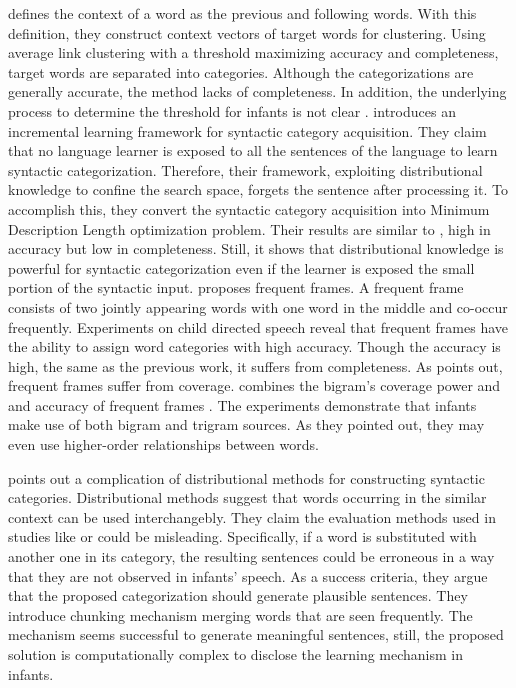 \cite{Redington98distributionalinformation} defines the context of
a word as the previous and following words. With this definition, they construct
context vectors of target words for clustering. Using average link clustering
with a threshold maximizing accuracy and completeness, target  words are
separated into categories. Although the categorizations are generally accurate,
the method lacks of completeness. In addition, the underlying process to determine
the threshold for infants is not clear \cite{ambridge2011child}. \cite{cartwright1997syntactic} introduces an incremental learning framework for syntactic category acquisition. They claim that no language 
learner is exposed to all the sentences of the language to learn
syntactic categorization. Therefore, their framework, exploiting
distributional knowledge to confine the search space, forgets the sentence
after processing it. To accomplish this, they convert the syntactic category acquisition into 
Minimum Description Length optimization problem. Their results are 
similar to \cite{Redington98distributionalinformation}, high in 
accuracy but low in completeness. Still, it shows that distributional
knowledge is powerful for syntactic categorization even if the learner is
exposed the small portion of the syntactic input. \cite{Mintz200391} proposes frequent frames. A frequent frame consists of two jointly appearing words with one word in the middle and co-occur
frequently. Experiments on child directed speech reveal that 
frequent frames have the ability to assign word categories with high
accuracy. Though the accuracy is high, the same as the previous work, it suffers from
completeness. As \cite{clair2010} points out, frequent frames suffer from coverage.
\cite{clair2010} combines the bigram's 
coverage power \cite{Redington98distributionalinformation} and \cite{monaghan2008integration}
 and accuracy of frequent frames \cite{Mintz200391}. The 
experiments demonstrate that infants make use of both bigram and 
trigram sources. As they pointed out, they may even use higher-order 
relationships between words. 

\cite{freudenthal2005resolution} points out a complication of distributional
methods for constructing syntactic categories. Distributional methods suggest 
that words occurring in the similar context  can be used interchangebly. They 
claim the evaluation methods used in studies like \cite{Redington98distributionalinformation, monaghan2008integration} or \cite{Mintz200391} could be misleading. Specifically, if a word is substituted with another one in its
category, the resulting sentences could be erroneous in a way that they are not observed in
infants' speech. As a success criteria, they argue that the proposed categorization
should generate plausible sentences. They introduce chunking mechanism merging 
words that are seen frequently. The mechanism seems
successful to generate meaningful sentences, still, the
proposed solution is computationally complex to disclose the learning mechanism
in infants.

